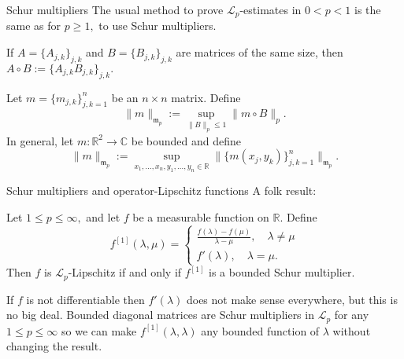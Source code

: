 \documentclass{beamer}
\numberwithin{equation}{section}
\theoremstyle{plain}
\theoremstyle{plain}
\theoremstyle{definition}
\theoremstyle{plain}
\theoremstyle{plain}
\theoremstyle{definition}
\newcommand{\Rl}{\mathbb{R}}
\newcommand{\Cplx}{\mathbb{C}}
\newcommand{\Lc}{\mathcal{L}}
\newcommand{\mf}{\mathfrak{m}}
\begin{document}
\begin{frame}{Schur multipliers}
    The usual method to prove $\Lc_p$-estimates in $0<p<1$ is the same as for $p\geq 1,$ to use Schur multipliers.

    If $A = \{A_{j,k}\}_{j,k}$ and $B = \{B_{j,k}\}_{j,k}$ are matrices of the same size, then $A\circ B := \{A_{j,k}B_{j,k}\}_{j,k}.$

    \begin{definition}
        Let $m = \{m_{j,k}\}_{j,k=1}^n$ be an $n\times n$ matrix. Define
        \[
            \|m\|_{\mf_p} := \sup_{\|B\|_{p}\leq 1} \|m\circ B\|_p.
        \]
        In general, let $m:\Rl^2\to \Cplx$ be bounded and define
        \[
            \|m\|_{\mf_p} := \sup_{x_1,\ldots,x_n,y_1,\ldots,y_n\in \Rl} \|\{m(x_j,y_k)\}_{j,k=1}^n\|_{\mf_p}.
        \]
    \end{definition}
\end{frame}

\begin{frame}{Schur multipliers and operator-Lipschitz functions}
    A folk result:
    \begin{theorem}
        Let $1\leq p\leq \infty,$ and let $f$ be a measurable function on $\Rl.$ Define
        \[
            f^{[1]}(\lambda,\mu) = \begin{cases}
                                        \frac{f(\lambda)-f(\mu)}{\lambda-\mu},\quad \lambda \neq \mu\\
                                        f'(\lambda),\quad \lambda=\mu.
                                   \end{cases}
        \]
        Then $f$ is $\Lc_p$-Lipschitz if and only if $f^{[1]}$ is a bounded Schur multiplier.
    \end{theorem}
    \pause
    If $f$ is not differentiable then $f'(\lambda)$ does not make sense everywhere, but this is no big deal. Bounded diagonal matrices are Schur multipliers in $\Lc_p$
    for any $1\leq p\leq \infty$ so we can make $f^{[1]}(\lambda,\lambda)$ any bounded function of $\lambda$ without changing the result.
\end{frame}
\end{document}
